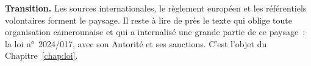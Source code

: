 \begin{boxinfo}
\textbf{Transition.} Les sources internationales, le règlement européen et
les référentiels volontaires forment le paysage. Il reste à lire de près le
texte qui oblige toute organisation camerounaise et qui a internalisé une
grande partie de ce paysage~: la loi n°~2024/017, avec son Autorité et ses
sanctions. C'est l'objet du Chapitre~\ref{chap:loi}.
\end{boxinfo}
